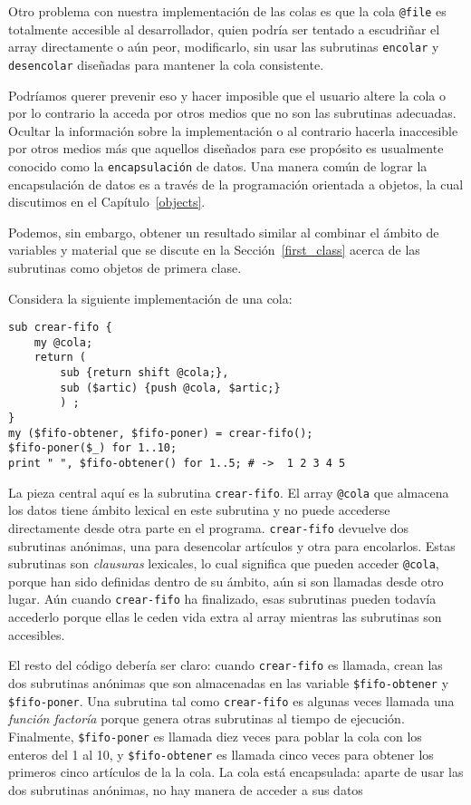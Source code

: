 Otro problema con nuestra implementación de las colas es 
que la cola \verb|@file| es totalmente accesible al desarrollador,
quien podría ser tentado a escudriñar el array directamente o
aún peor, modificarlo, sin usar las subrutinas {\tt encolar}
y {\tt desencolar} diseñadas para mantener la cola consistente.

Podríamos querer prevenir eso y hacer imposible que el usuario
altere la cola o por lo contrario la acceda por otros medios
que no son las subrutinas adecuadas. Ocultar la información
sobre la implementación o al contrario hacerla inaccesible
por otros medios más que aquellos diseñados para ese propósito
es usualmente conocido como la {\tt encapsulación} de datos. 
Una manera común de lograr la encapsulación de datos es a través
de la programación orientada a objetos, la cual discutimos en
el Capítulo~\ref{objects}. 

Podemos, sin embargo, obtener un resultado similar al combinar
el ámbito de variables y material que se discute en la Sección~\ref{first_class}
acerca de las subrutinas como objetos de primera clase.

Considera la siguiente implementación de una cola:
\begin{verbatim}
sub crear-fifo {
    my @cola;
    return (
        sub {return shift @cola;}, 
        sub ($artic) {push @cola, $artic;}
        ) ;
}
my ($fifo-obtener, $fifo-poner) = crear-fifo();
$fifo-poner($_) for 1..10;
print " ", $fifo-obtener() for 1..5; # ->  1 2 3 4 5
\end{verbatim}
%
La pieza central aquí es la subrutina {\tt crear-fifo}.
El array \verb|@cola| que almacena los datos tiene ámbito 
lexical en este subrutina y no puede accederse directamente
desde otra parte en el programa. {\tt crear-fifo} devuelve
dos subrutinas anónimas, una para desencolar artículos
y otra para encolarlos. Estas subrutinas son \emph{clausuras}
lexicales, lo cual significa que pueden acceder \verb|@cola|,
porque han sido definidas dentro de su ámbito, aún si son 
llamadas desde otro lugar. Aún cuando {\tt crear-fifo} ha
finalizado, esas subrutinas pueden todavía accederlo porque
ellas le ceden vida extra al array mientras las subrutinas
son accesibles.

El resto del código debería ser claro: cuando {\tt crear-fifo}
es llamada, crean las dos subrutinas anónimas que son almacenadas
en las variable \verb|$fifo-obtener| y \verb|$fifo-poner|. Una 
subrutina tal como {\tt crear-fifo} es algunas veces llamada
una \emph{función factoría} porque genera otras subrutinas al 
tiempo de ejecución. Finalmente, \verb|$fifo-poner| es llamada
diez veces para poblar la cola con los enteros del 1 al 10, y 
\verb|$fifo-obtener| es llamada cinco veces para obtener los 
primeros cinco artículos de la la cola. La cola está encapsulada:
aparte de usar las dos subrutinas anónimas, no hay manera de
acceder a sus datos 

